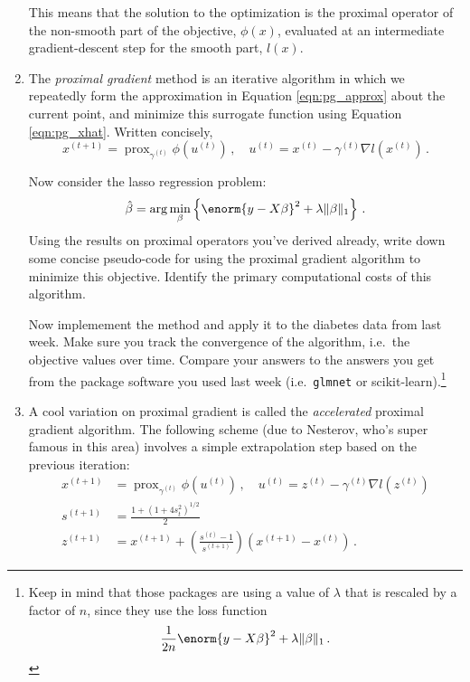 \documentclass{article}
\DeclareMathOperator*{\prox}{prox}
\begin{document}
\begin{enumerate}[label=(\Alph*)]
{This means that the solution to the optimization is the proximal operator of the non-smooth part of the objective, $\phi(x)$, evaluated at an intermediate gradient-descent step for the smooth part, $l(x)$.

}





\item The \textit{proximal gradient} method is an iterative algorithm in which we repeatedly form the approximation in Equation \ref{eqn:pg_approx} about the current point, and minimize this surrogate function using Equation \ref{eqn:pg_xhat}.  Written concisely,
$$
x^{(t+1)} = \prox_{\gamma^{(t)}} \phi(u^{(t)}) \, , \quad u^{(t)} = x^{(t)} - \gamma^{(t)} \nabla l(x^{(t)}) \, .
$$

Now consider the lasso regression problem:
$$
\hat{\beta} = \arg \min_{\beta} \left\{  \enorm{y - X\beta}^2 + \lambda \Vert \beta \Vert_1 \right\} \, .
$$
Using the results on proximal operators you've derived already, write down some concise pseudo-code for using the proximal gradient algorithm to minimize this objective.  Identify the primary computational costs of this algorithm.

Now implemement the method and apply it to the diabetes data from last week.  Make sure you track the convergence of the algorithm, i.e.~the objective values over time.  Compare your answers to the answers you get from the package software you used last week (i.e.~\verb|glmnet| or scikit-learn).\footnote{Keep in mind that those packages are using a value of $\lambda$ that is rescaled by a factor of $n$, since they use the loss function
$$
\frac{1}{2n} \enorm{y - X\beta}^2  + \lambda \Vert \beta \Vert_1 \, .
$$
}

\item A cool variation on proximal gradient is called the \textit{accelerated} proximal gradient algorithm.   The following scheme (due to Nesterov, who's super famous in this area) involves a simple extrapolation step based on the previous iteration:
$$
\begin{aligned}
x^{(t+1)} &= \prox_{ \gamma^{(t)}} \phi(u^{(t)}) \, , \quad u^{(t)} =  z^{(t)} - \gamma^{(t)} \nabla l(z^{(t)})  \\
s^{(t+1)} &= \frac{1 + (1 + 4 s_{t}^2)^{1/2}}{2} \\
z^{(t+1)} &=  x^{(t+1)} + \left( \frac{s^{(t)} - 1}{s^{(t+1)}} \right) (x^{(t+1)} - x^{(t)}) \, .
\end{aligned}
$$




\end{enumerate}
\end{document}
